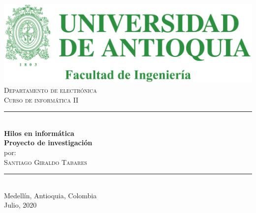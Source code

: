 \documentclass[12pt]{article}
\begin{document}
\begin{titlepage}
\BgThispage
\newcommand{\HRule}{\rule{\linewidth}{0.5mm}}
\center
\includegraphics[scale=0.4]{Escudo.jpg}\\[0.5 cm]
\textsc{\large Departamento de electrónica}\\[0.5cm]
\textsc{\large Curso de informática II}\\[0.5cm] 
\HRule \\[0.4cm]
{ \huge \bfseries Hilos en informática \\[0.5 cm]\LARGE Proyecto de investigación}\\[0.4cm]
\large{por: }\\[0.3cm]
\textsc{Santiago Giraldo Tabares}\\
\HRule \\[1.5cm]
{\LARGE{Medellín, Antioquia, Colombia\\[0.2 cm]Julio, 2020}}\\
\vfill
\end{titlepage}
\end{document}
